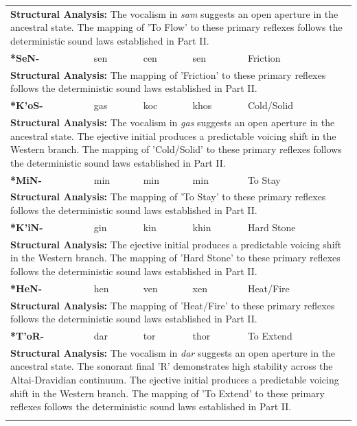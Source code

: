 \begin{longtable}{p{} p{} p{} p{} p{}}
\multicolumn{5}{p{\textwidth}}{\small \textbf{Structural Analysis:} The vocalism in \textit{sam} suggests an open aperture in the ancestral state. The mapping of 'To Flow' to these primary reflexes follows the deterministic sound laws established in Part II.} \\ \addlinespace[15pt] 
\textbf{*SeN-} & sen & cen & sen & Friction \\ 
\multicolumn{5}{p{\textwidth}}{\small \textbf{Structural Analysis:}  The mapping of 'Friction' to these primary reflexes follows the deterministic sound laws established in Part II.} \\ \addlinespace[15pt] 
\textbf{*K'oS-} & gas & koc & khos & Cold/Solid \\ 
\multicolumn{5}{p{\textwidth}}{\small \textbf{Structural Analysis:} The vocalism in \textit{gas} suggests an open aperture in the ancestral state. The ejective initial produces a predictable voicing shift in the Western branch. The mapping of 'Cold/Solid' to these primary reflexes follows the deterministic sound laws established in Part II.} \\ \addlinespace[15pt] 
\textbf{*MiN-} & min & min & min & To Stay \\ 
\multicolumn{5}{p{\textwidth}}{\small \textbf{Structural Analysis:}  The mapping of 'To Stay' to these primary reflexes follows the deterministic sound laws established in Part II.} \\ \addlinespace[15pt] 
\textbf{*K'iN-} & gin & kin & khin & Hard Stone \\ 
\multicolumn{5}{p{\textwidth}}{\small \textbf{Structural Analysis:} The ejective initial produces a predictable voicing shift in the Western branch. The mapping of 'Hard Stone' to these primary reflexes follows the deterministic sound laws established in Part II.} \\ \addlinespace[15pt] 
\textbf{*HeN-} & hen & ven & xen & Heat/Fire \\ 
\multicolumn{5}{p{\textwidth}}{\small \textbf{Structural Analysis:}  The mapping of 'Heat/Fire' to these primary reflexes follows the deterministic sound laws established in Part II.} \\ \addlinespace[15pt] 
\textbf{*T'oR-} & dar & tor & thor & To Extend \\ 
\multicolumn{5}{p{\textwidth}}{\small \textbf{Structural Analysis:} The vocalism in \textit{dar} suggests an open aperture in the ancestral state. The sonorant final 'R' demonstrates high stability across the Altai-Dravidian continuum. The ejective initial produces a predictable voicing shift in the Western branch. The mapping of 'To Extend' to these primary reflexes follows the deterministic sound laws established in Part II.} \\ \addlinespace[15pt] 

\end{longtable}
